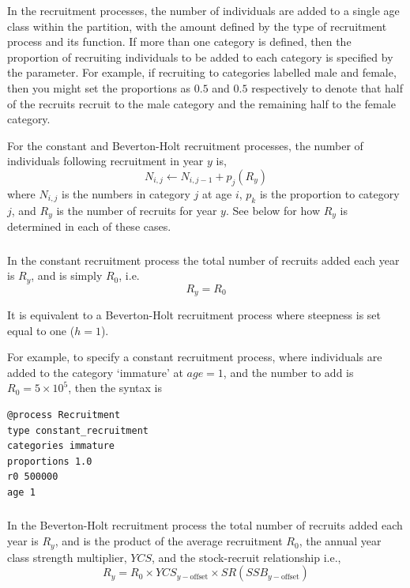 In the recruitment processes, the number of individuals are added to a single age class within the partition, with the amount defined by the type of recruitment process and its function. If more than one category is defined, then the proportion of recruiting individuals to be added to each category is specified by the  parameter. For example, if recruiting to categories labelled male and female, then you might set the proportions as $0.5$ and $0.5$ respectively to denote that half of the recruits recruit to the male category and the remaining half to the female category.

For the constant and Beverton-Holt recruitment processes, the  number of individuals following recruitment in year $y$ is,  
\begin{equation}
N_{i,j} \leftarrow N_{i,j - 1} + p_j(R_y)
\end{equation}
where $N_{i,j}$ is the numbers in category $j$ at age $i$, $p_k$ is the proportion to category $j$, and $R_y$ is the number of recruits for year $y$. See below for how $R_y$ is determined in each of these cases.

\subsubsection*{}
\CH
In the constant recruitment process the total number of recruits added each year is $R_y$, and is simply $R_0$, i.e.
\begin{equation}
  R_y = R_0
\end{equation}

It is equivalent to a Beverton-Holt recruitment process where steepness is set equal to one ($h=1$).

For example, to specify a constant recruitment process, where individuals are added to the category `immature' at $age=1$, and the number to add is $R_0=5 \times 10^5$, then the syntax is

{\small{\begin{verbatim}
@process Recruitment
type constant_recruitment
categories immature
proportions 1.0
r0 500000
age 1
\end{verbatim}}}

\subsubsection*{}
\CH
In the Beverton-Holt recruitment process the total number of recruits added each year is $R_y$, and is the product of the average recruitment $R_0$, the annual year class strength multiplier, $YCS$, and the stock-recruit relationship i.e.,
\begin{equation}
  R_y = R_0 \times YCS_{y-\text{offset}} \times SR(SSB_{y-\text{offset}})
\end{equation}
  
